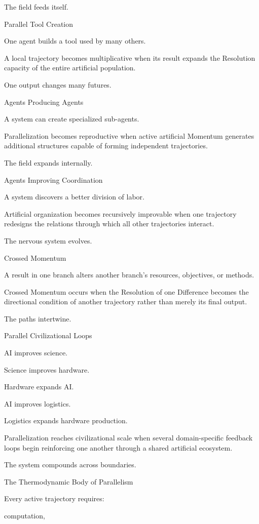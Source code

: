 The field feeds itself.

Parallel Tool Creation

One agent builds a tool used by many others.

A local trajectory becomes multiplicative when its result expands the Resolution capacity of the entire artificial population.

One output changes many futures.

Agents Producing Agents

A system can create specialized sub-agents.

Parallelization becomes reproductive when active artificial Momentum generates additional structures capable of forming independent trajectories.

The field expands internally.

Agents Improving Coordination

A system discovers a better division of labor.

Artificial organization becomes recursively improvable when one trajectory redesigns the relations through which all other trajectories interact.

The nervous system evolves.

Crossed Momentum

A result in one branch alters another branch’s resources, objectives, or methods.

Crossed Momentum occurs when the Resolution of one Difference becomes the directional condition of another trajectory rather than merely its final output.

The paths intertwine.

Parallel Civilizational Loops

AI improves science.

Science improves hardware.

Hardware expands AI.

AI improves logistics.

Logistics expands hardware production.

Parallelization reaches civilizational scale when several domain-specific feedback loops begin reinforcing one another through a shared artificial ecosystem.

The system compounds across boundaries.

The Thermodynamic Body of Parallelism

Every active trajectory requires:

computation,

